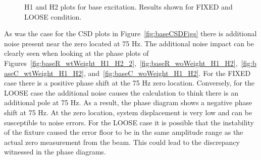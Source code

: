 \documentclass[paper=a4, fontsize=12pt]{scrartcl} %
\begin{document}
%
	\begin{figure}[H]
		\centering
		\quad
		\quad
		\quad
		\caption{H1 and H2 plots for base excitation. Results shown for FIXED and LOOSE condition.}
		\label{fig:baseH1H2Figs}
	\end{figure}
%
As was the case for the CSD plots in Figure~\ref{fig:baseCSDFigs} there is additional noise present near the zero located at 75 Hz. The additional noise impact can be clearly seen when looking at the phase plots of Figures~\ref{fig:baseR_wtWeight_H1_H2_2},~\ref{fig:baseR_woWeight_H1_H2},~\ref{fig:baseC_wtWeight_H1_H2}, and~\ref{fig:baseC_woWeight_H1_H2}. For the FIXED case there is a positive phase shift at the 75 Hz zero location. Conversely, for the LOOSE case the additional noise causes the calculation to think there is an additional pole at 75 Hz. As a result, the phase diagram shows a negative phase shift at 75 Hz. At the zero location, system displacement is very low and can be susceptible to noise errors. For the LOOSE case it is possible that the instability of the fixture caused the error floor to be in the same amplitude range as the actual zero measurement from the beam. This could lead to the discrepancy witnessed in the phase diagrams.
\end{document}
